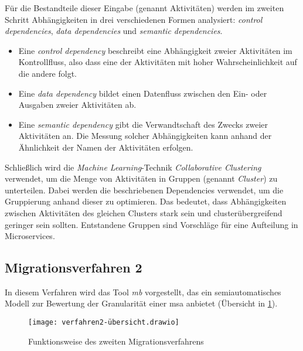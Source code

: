 Für die Bestandteile dieser Eingabe (genannt Aktivitäten) werden im zweiten Schritt Abhängigkeiten in drei verschiedenen Formen analysiert: \emph{control dependencies}, \emph{data dependencies} und \emph{semantic dependencies}.
\begin{itemize}
	\item Eine \emph{control dependency} beschreibt eine Abhängigkeit zweier Aktivitäten im Kontrollfluss, also dass eine der Aktivitäten mit hoher Wahrscheinlichkeit auf die andere folgt.
	\item Eine \emph{data dependency} bildet einen Datenfluss zwischen den Ein- oder Ausgaben zweier Aktivitäten ab.
	\item Eine \emph{semantic dependency} gibt die Verwandtschaft des Zwecks zweier Aktivitäten an.
	Die Messung solcher Abhängigkeiten kann anhand der Ähnlichkeit der Namen der Aktivitäten erfolgen.
\end{itemize}

Schließlich wird die \emph{Machine Learning}-Technik \emph{Collaborative Clustering} verwendet, um die Menge von Aktivitäten in Gruppen (genannt \emph{Cluster}) zu unterteilen.
Dabei werden die beschriebenen Dependencies verwendet, um die Gruppierung anhand dieser zu optimieren.
Das bedeutet, dass Abhängigkeiten zwischen Aktivitäten des gleichen Clusters stark sein und clusterübergreifend geringer sein sollten.
Entstandene Gruppen sind Vorschläge für eine Aufteilung in Microservices.

\subsection{Migrationsverfahren 2}

In diesem Verfahren wird das Tool \emph{\acrfull{mb}} vorgestellt, das ein semiautomatisches Modell zur Bewertung der Granularität einer \gls{msa} anbietet (Übersicht in \cref{fig:interviews-migrationsverfahren2}).

\begin{figure}[!ht]
	\centering
	\texttt{[image: verfahren2-übersicht.drawio]}
	\caption[Funktionsweise Migrationsverfahren 2]{
		Funktionsweise des zweiten Migrationsverfahrens
	}
	\label{fig:interviews-migrationsverfahren2}
\end{figure} 

